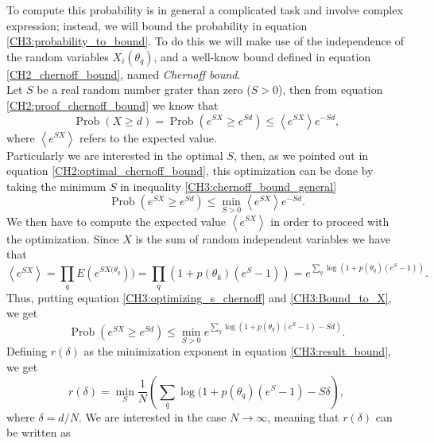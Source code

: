 To compute this probability is in general a complicated task and involve complex expression; instead, we will bound the probability in equation \eqref{CH3:probability_to_bound}. To do this we will make use of the independence of the random variables $X_{i}(\theta_q)$, and a well-know bound defined in equation \eqref{CH2_chernoff_bound}, named \textit{Chernoff bound}.\\
Let $S$ be a real random number grater than zero ($S>0$), then from equation \eqref{CH2:proof_chernoff_bound} we know that
\begin{equation}
\operatorname{Prob}(X\geq d) = \operatorname{Prob}(e^{SX}\geq e^{Sd})\leq \left\langle e^{S X}\right\rangle e^{-S d},
\label{CH3:chernoff_bound_general}
\end{equation}
where $ \left\langle e^{S X}\right\rangle$ refers to the expected value.\\
\indent Particularly we are interested in the optimal $S$, then, as we pointed out in equation \eqref{CH2:optimal_chernoff_bound}, this optimization can be done by taking the minimum $S$ in inequality \eqref{CH3:chernoff_bound_general}
\begin{equation}
\operatorname{Prob}(e^{SX}\geq e^{Sd})\leq \min_{S>0} \left\langle e^{S X}\right\rangle e^{-S d}.
\label{CH3:optimizing_s_chernoff}
\end{equation}
We then have to compute the expected value $\left\langle e^{S X}\right\rangle$ in order to proceed with the optimization. Since $X$ is the sum of random independent variables we have that
\begin{equation}
\left\langle e^{S X}\right\rangle = \prod_{q}  E(e^{S X(\theta_q})) = \prod_q \left(1+p(\theta_k)(e^S -1)\right) = e^{\sum_{q}\log(1+p(\theta_q)(e^S -1))}.
\label{CH3:Bound_to_X}
\end{equation}
Thus, putting equation \eqref{CH3:optimizing_s_chernoff} and \eqref{CH3:Bound_to_X}, we get
\begin{equation}
\operatorname{Prob}(e^{SX}\geq e^{Sd})\leq \min_{S>0}  e^{\sum_{q}\log(1+p(\theta_q)(e^S -1)-Sd)}.
\label{CH3:result_bound}
\end{equation}
Defining $r(\delta)$ as the minimization exponent in equation \eqref{CH3:result_bound}, we get
\begin{equation}
r(\delta) = \min_{S} \frac{1}{N} \left(\sum_{q}\log(1+p(\theta_q)(e^S -1) - S\delta\right),
\label{CH3:error_exponent}
\end{equation}
where $\delta = d/N$. We are interested in the case $N\to \infty$,  meaning that $r(\delta)$ can be written as
